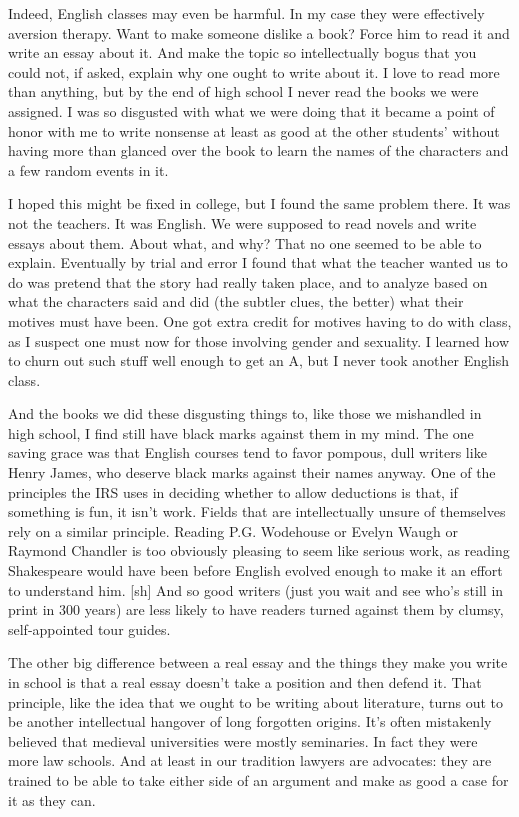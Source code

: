 \documentclass[12pt]{book}
\begin{document}
Indeed, English classes may even be harmful. In my case they were
effectively aversion therapy. Want to make someone dislike a book? Force
him to read it and write an essay about it. And make the topic so
intellectually bogus that you could not, if asked, explain why one ought
to write about it. I love to read more than anything, but by the end of
high school I never read the books we were assigned. I was so disgusted
with what we were doing that it became a point of honor with me to write
nonsense at least as good at the other students' without having more
than glanced over the book to learn the names of the characters and a
few random events in it.

I hoped this might be fixed in college, but I found the same problem
there. It was not the teachers. It was English. We were supposed to read
novels and write essays about them. About what, and why? That no one
seemed to be able to explain. Eventually by trial and error I found that
what the teacher wanted us to do was pretend that the story had really
taken place, and to analyze based on what the characters said and did
(the subtler clues, the better) what their motives must have been. One
got extra credit for motives having to do with class, as I suspect one
must now for those involving gender and sexuality. I learned how to
churn out such stuff well enough to get an A, but I never took another
English class.

And the books we did these disgusting things to, like those we
mishandled in high school, I find still have black marks against them in
my mind. The one saving grace was that English courses tend to favor
pompous, dull writers like Henry James, who deserve black marks against
their names anyway. One of the principles the IRS uses in deciding
whether to allow deductions is that, if something is fun, it isn't work.
Fields that are intellectually unsure of themselves rely on a similar
principle. Reading P.G. Wodehouse or Evelyn Waugh or Raymond Chandler is
too obviously pleasing to seem like serious work, as reading Shakespeare
would have been before English evolved enough to make it an effort to
understand him. {[}sh{]} And so good writers (just you wait and see
who's still in print in 300 years) are less likely to have readers
turned against them by clumsy, self-appointed tour guides.

The other big difference between a real essay and the things they make
you write in school is that a real essay doesn't take a position and
then defend it. That principle, like the idea that we ought to be
writing about literature, turns out to be another intellectual hangover
of long forgotten origins. It's often mistakenly believed that medieval
universities were mostly seminaries. In fact they were more law schools.
And at least in our tradition lawyers are advocates: they are trained to
be able to take either side of an argument and make as good a case for
it as they can.
\end{document}

